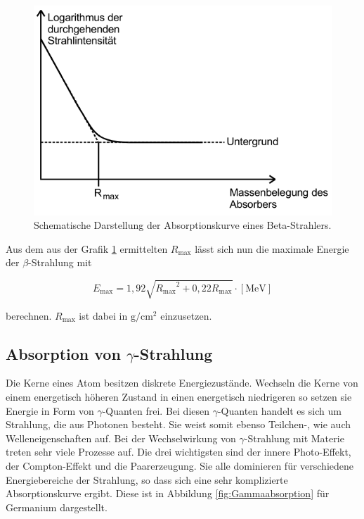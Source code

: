 \begin{figure}
  \centering
  \includegraphics[scale=0.7]{pictures/betaabsorption.png}
  \caption{Schematische Darstellung der Absorptionskurve eines Beta-Strahlers.\cite{sample}}
  \label{fig:betaabsorption}
\end{figure}

Aus dem aus der Grafik \ref{fig:betaabsorption} ermittelten $R_\text{max}$ lässt sich nun die maximale Energie der $\beta$-Strahlung mit

\begin{equation}
  E_\text{max} = 1,92 \sqrt{{R_\text{max}}^2 + 0,22 R_\text{max}} \cdot [\si{\mega\electronvolt}]
  \label{eqn:betaenergie}
\end{equation}

berechnen. $R_\text{max}$ ist dabei in $\si{\gram\per\centi\metre\squared}$ einzusetzen.

\FloatBarrier
\subsection{Absorption von \texorpdfstring{$\gamma$}{Gamma}-Strahlung}

Die Kerne eines Atom besitzen diskrete Energiezustände.
Wechseln die Kerne von einem energetisch höheren Zustand in einen energetisch niedrigeren so setzen sie Energie in Form von $\gamma$-Quanten frei.
Bei diesen $\gamma$-Quanten handelt es sich um Strahlung, die aus Photonen besteht.
Sie weist somit ebenso Teilchen-, wie auch Welleneigenschaften auf.
Bei der Wechselwirkung von $\gamma$-Strahlung mit Materie treten sehr viele Prozesse auf.
Die drei wichtigsten sind der innere Photo-Effekt, der Compton-Effekt und die Paarerzeugung.
Sie alle dominieren für verschiedene Energiebereiche der Strahlung, so dass sich eine sehr komplizierte Absorptionskurve ergibt.
Diese ist in Abbildung \ref{fig:Gammaabsorption} für Germanium dargestellt.

